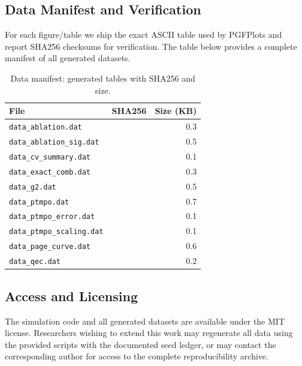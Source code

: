 \documentclass[a4paper,11pt]{article}
\theoremstyle{plain}
\theoremstyle{definition}
\theoremstyle{remark}
\begin{document}
\subsection{Data Manifest and Verification}
For each figure/table we ship the exact ASCII table used by PGFPlots and report SHA256 checksums for verification. The table below provides a complete manifest of all generated datasets.

\begin{table}[t]
\centering
\caption{Data manifest: generated tables with SHA256 and size.}
\label{tab:datamanifest}
\footnotesize
\begin{tabularx}{\textwidth}{@{}T T r@{}}
\toprule
File & SHA256 & Size (KB) \\
\midrule
\texttt{data\_ablation.dat} &  & 0.3 \\
\texttt{data\_ablation\_sig.dat} &  & 0.5 \\
\texttt{data\_cv\_summary.dat} &  & 0.1 \\
\texttt{data\_exact\_comb.dat} &  & 0.3 \\
\texttt{data\_g2.dat} &  & 0.5 \\
\texttt{data\_ptmpo.dat} &  & 0.7 \\
\texttt{data\_ptmpo\_error.dat} &  & 0.1 \\
\texttt{data\_ptmpo\_scaling.dat} &  & 0.1 \\
\texttt{data\_page\_curve.dat} &  & 0.6 \\
\texttt{data\_qec.dat} &  & 0.2 \\
\bottomrule
\end{tabularx}
\end{table}

\subsection{Access and Licensing}
The simulation code and all generated datasets are available under the MIT license. Researchers wishing to extend this work may regenerate all data using the provided scripts with the documented seed ledger, or may contact the corresponding author for access to the complete reproducibility archive.
\end{document}
